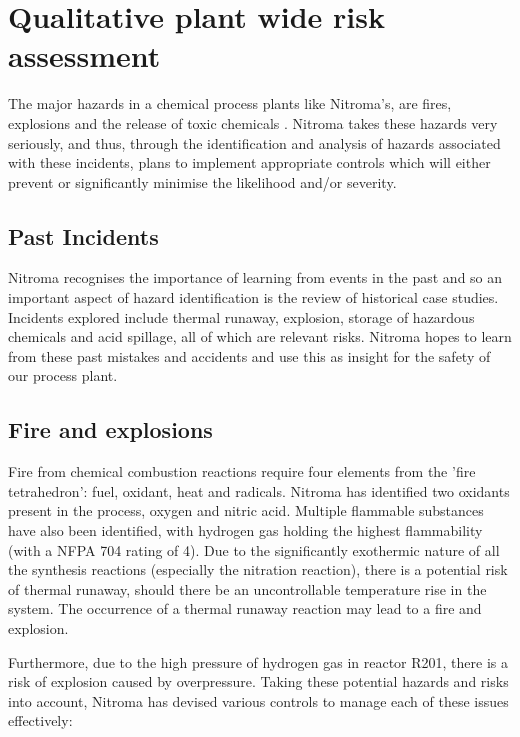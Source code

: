 \section{Qualitative plant wide risk assessment}

The major hazards in a chemical process plants like Nitroma’s, are fires, explosions and the release of toxic chemicals \cite{mannan_lees_2012}. Nitroma takes these hazards very seriously, and thus, through the identification and analysis of hazards associated with these incidents, plans to implement appropriate controls which will either prevent or significantly minimise the likelihood and/or severity. 


\subsection{Past Incidents}

Nitroma recognises the importance of learning from events in the past and so an important aspect of hazard identification is the review of historical case studies. Incidents explored include thermal runaway, explosion, storage of hazardous chemicals and acid spillage, all of which are relevant risks. Nitroma hopes to learn from these past mistakes and accidents and use this as insight for the safety of our process plant.

\subsection{Fire and explosions}

Fire from chemical combustion reactions require four elements from the 'fire tetrahedron': fuel, oxidant, heat and radicals. Nitroma has identified two oxidants present in the process, oxygen and nitric acid. Multiple flammable substances have also been identified, with hydrogen gas holding the highest flammability (with a NFPA 704 rating of 4). Due to the significantly exothermic nature of all the synthesis reactions (especially the nitration reaction), there is a potential risk of thermal runaway, should there be an uncontrollable temperature rise in the system. The occurrence of a thermal runaway reaction may lead to a fire and explosion.  

Furthermore, due to the high pressure of hydrogen gas in reactor R201, there is a risk of explosion caused by overpressure. Taking these potential hazards and risks into account, Nitroma has devised various controls to manage each of these issues effectively: 


